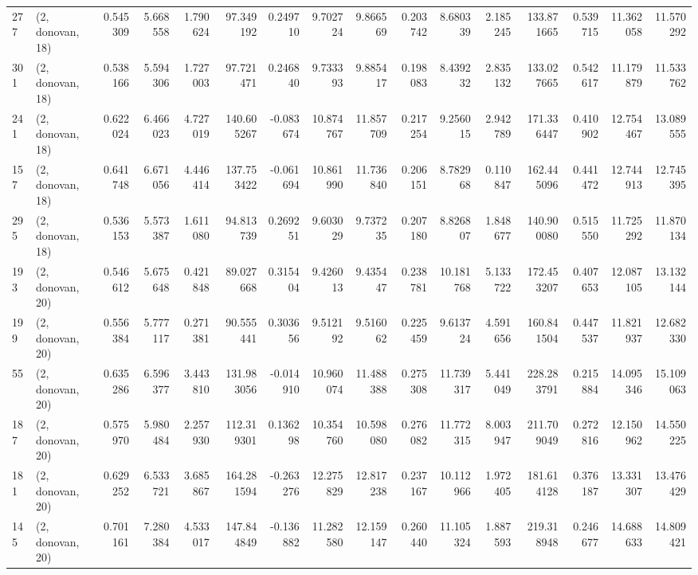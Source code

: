 \begin{tabular}{llrrrrrrrrrrrrrr}
277 &  (2, donovan, 18) &   0.545309 &   5.668558 &   1.790624 &    97.349192 &   0.249710 &   9.702724 &   9.866569 &  0.203742 &   8.680339 &   2.185245 &   133.871665 &  0.539715 &  11.362058 &  11.570292 \\
301 &  (2, donovan, 18) &   0.538166 &   5.594306 &   1.727003 &    97.721471 &   0.246840 &   9.733393 &   9.885417 &  0.198083 &   8.439232 &   2.835132 &   133.027665 &  0.542617 &  11.179879 &  11.533762 \\
241 &  (2, donovan, 18) &   0.622024 &   6.466023 &   4.727019 &   140.605267 &  -0.083674 &  10.874767 &  11.857709 &  0.217254 &   9.256015 &   2.942789 &   171.336447 &  0.410902 &  12.754467 &  13.089555 \\
157 &  (2, donovan, 18) &   0.641748 &   6.671056 &   4.446414 &   137.753422 &  -0.061694 &  10.861990 &  11.736840 &  0.206151 &   8.782968 &   0.110847 &   162.445096 &  0.441472 &  12.744913 &  12.745395 \\
295 &  (2, donovan, 18) &   0.536153 &   5.573387 &   1.611080 &    94.813739 &   0.269251 &   9.603029 &   9.737235 &  0.207180 &   8.826807 &   1.848677 &   140.900080 &  0.515550 &  11.725292 &  11.870134 \\
193 &  (2, donovan, 20) &   0.546612 &   5.675648 &   0.421848 &    89.027668 &   0.315404 &   9.426013 &   9.435447 &  0.238781 &  10.181768 &   5.133722 &   172.453207 &  0.407653 &  12.087105 &  13.132144 \\
199 &  (2, donovan, 20) &   0.556384 &   5.777117 &   0.271381 &    90.555441 &   0.303656 &   9.512192 &   9.516062 &  0.225459 &   9.613724 &   4.591656 &   160.841504 &  0.447537 &  11.821937 &  12.682330 \\
55  &  (2, donovan, 20) &   0.635286 &   6.596377 &   3.443810 &   131.983056 &  -0.014910 &  10.960074 &  11.488388 &  0.275308 &  11.739317 &   5.441049 &   228.283791 &  0.215884 &  14.095346 &  15.109063 \\
187 &  (2, donovan, 20) &   0.575970 &   5.980484 &   2.257930 &   112.319301 &   0.136298 &  10.354760 &  10.598080 &  0.276082 &  11.772315 &   8.003947 &   211.709049 &  0.272816 &  12.150962 &  14.550225 \\
181 &  (2, donovan, 20) &   0.629252 &   6.533721 &   3.685867 &   164.281594 &  -0.263276 &  12.275829 &  12.817238 &  0.237167 &  10.112966 &   1.972405 &   181.614128 &  0.376187 &  13.331307 &  13.476429 \\
145 &  (2, donovan, 20) &   0.701161 &   7.280384 &   4.533017 &   147.844849 &  -0.136882 &  11.282580 &  12.159147 &  0.260440 &  11.105324 &   1.887593 &   219.318948 &  0.246677 &  14.688633 &  14.809421 \\

\end{tabular}
